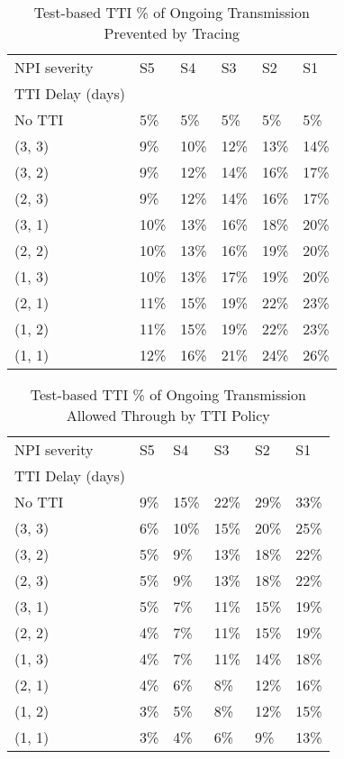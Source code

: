 \documentclass{article}
\begin{document}
    \begin{table}[H]
        \centering
         \begin{tabular}{llllll}
\toprule
NPI severity &    S5 &    S4 &    S3 &    S2 &    S1 \\
TTI Delay (days) &       &       &       &       &       \\
\midrule
No TTI           &   5\% &   5\% &   5\% &   5\% &   5\% \\
(3, 3)           &   9\% &  10\% &  12\% &  13\% &  14\% \\
(3, 2)           &   9\% &  12\% &  14\% &  16\% &  17\% \\
(2, 3)           &   9\% &  12\% &  14\% &  16\% &  17\% \\
(3, 1)           &  10\% &  13\% &  16\% &  18\% &  20\% \\
(2, 2)           &  10\% &  13\% &  16\% &  19\% &  20\% \\
(1, 3)           &  10\% &  13\% &  17\% &  19\% &  20\% \\
(2, 1)           &  11\% &  15\% &  19\% &  22\% &  23\% \\
(1, 2)           &  11\% &  15\% &  19\% &  22\% &  23\% \\
(1, 1)           &  12\% &  16\% &  21\% &  24\% &  26\% \\
\bottomrule
\end{tabular}

        \caption{Test-based TTI \% of Ongoing Transmission Prevented by Tracing}
    \end{table}
    


    \begin{table}[H]
        \centering
         \begin{tabular}{llllll}
\toprule
NPI severity &   S5 &    S4 &    S3 &    S2 &    S1 \\
TTI Delay (days) &      &       &       &       &       \\
\midrule
No TTI           &  9\% &  15\% &  22\% &  29\% &  33\% \\
(3, 3)           &  6\% &  10\% &  15\% &  20\% &  25\% \\
(3, 2)           &  5\% &   9\% &  13\% &  18\% &  22\% \\
(2, 3)           &  5\% &   9\% &  13\% &  18\% &  22\% \\
(3, 1)           &  5\% &   7\% &  11\% &  15\% &  19\% \\
(2, 2)           &  4\% &   7\% &  11\% &  15\% &  19\% \\
(1, 3)           &  4\% &   7\% &  11\% &  14\% &  18\% \\
(2, 1)           &  4\% &   6\% &   8\% &  12\% &  16\% \\
(1, 2)           &  3\% &   5\% &   8\% &  12\% &  15\% \\
(1, 1)           &  3\% &   4\% &   6\% &   9\% &  13\% \\
\bottomrule
\end{tabular}

        \caption{Test-based TTI \% of Ongoing Transmission Allowed Through by TTI Policy}
    \end{table}
    
\end{document}
